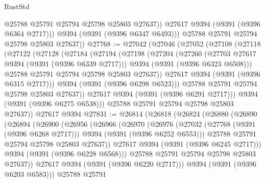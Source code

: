 \begin{lexlean}{RustStd}
\begin{coremodule}
                @25788
                @25791
                @25794
                @25798
                @25803
                @27637))
            @27617
            @9394
            (@9391 (@9396 @6364 @2717)))
          @9394
          (@9391 (@9396 @6347 @6493)))
        @25788
        @25791
        @25794
        @25798
        @25803
        @27637))
@27768 := @27042
    (@27046
      (@27052
        (@27108
          (@27118
            (@27122
              (@27128
                (@27184
                  (@27194
                    (@27198
                      (@27204
                        (@27260
                          (@27703 @27617 @9394 (@9391 (@9396 @6339 @2717)))
                          @9394
                          (@9391 (@9396 @6323 @6508)))
                        @25788
                        @25791
                        @25794
                        @25798
                        @25803
                        @27637))
                    @27617
                    @9394
                    (@9391 (@9396 @6315 @2717)))
                  @9394
                  (@9391 (@9396 @6298 @6523)))
                @25788
                @25791
                @25794
                @25798
                @25803
                @27637))
            @27617
            @9394
            (@9391 (@9396 @6291 @2717)))
          @9394
          (@9391 (@9396 @6275 @6538)))
        @25788
        @25791
        @25794
        @25798
        @25803
        @27637))
    @27617
    @9394
@27831 := @26814
    (@26818
      (@26824
        (@26880
          (@26890
            (@26894
              (@26900
                (@26956
                  (@26966
                    (@26970
                      (@26976
                        (@27032
                          (@27768 (@9391 (@9396 @6268 @2717)))
                          @9394
                          (@9391 (@9396 @6252 @6553)))
                        @25788
                        @25791
                        @25794
                        @25798
                        @25803
                        @27637))
                    @27617
                    @9394
                    (@9391 (@9396 @6245 @2717)))
                  @9394
                  (@9391 (@9396 @6228 @6568)))
                @25788
                @25791
                @25794
                @25798
                @25803
                @27637))
            @27617
            @9394
            (@9391 (@9396 @6220 @2717)))
          @9394
          (@9391 (@9396 @6203 @6583)))
        @25788
        @25791

\end{coremodule}
\end{lexlean}
